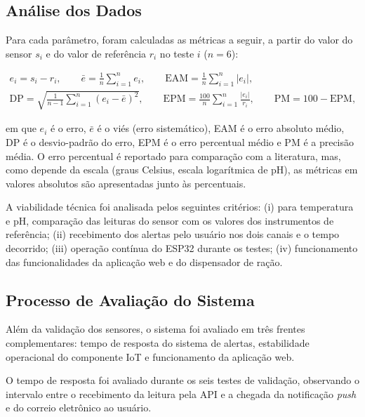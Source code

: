 \documentclass[11pt,a4paper]{article}
\begin{document}
\subsection{Análise dos Dados}

Para cada parâmetro, foram calculadas as métricas a seguir, a partir do valor do sensor $s_i$ e do valor de referência $r_i$ no teste $i$ ($n = 6$):

\begin{equation}
\begin{array}{c}
\displaystyle
e_i = s_i - r_i, \qquad
\bar{e} = \frac{1}{n}\sum_{i=1}^{n} e_i, \qquad
\mathrm{EAM} = \frac{1}{n}\sum_{i=1}^{n} |e_i|, \\[4mm]
\displaystyle
\mathrm{DP} = \sqrt{\frac{1}{n-1}\sum_{i=1}^{n}\left(e_i-\bar{e}\right)^2}, \qquad
\mathrm{EPM} = \frac{100}{n}\sum_{i=1}^{n} \frac{|e_i|}{r_i}, \qquad
\mathrm{PM} = 100 - \mathrm{EPM},
\end{array}
\end{equation}

\noindent em que $e_i$ é o erro, $\bar{e}$ é o viés (erro sistemático), EAM é o erro absoluto médio, DP é o desvio-padrão do erro, EPM é o erro percentual médio e PM é a precisão média. O erro percentual é reportado para comparação com a literatura, mas, como depende da escala (graus Celsius, escala logarítmica de pH), as métricas em valores absolutos são apresentadas junto às percentuais.
 
A viabilidade técnica foi analisada pelos seguintes critérios: (i) para temperatura e pH, comparação das leituras do sensor com os valores dos instrumentos de referência; (ii) recebimento dos alertas pelo usuário nos dois canais e o tempo decorrido; (iii) operação contínua do ESP32 durante os testes; (iv) funcionamento das funcionalidades da aplicação web e do dispensador de ração.
 
\subsection{Processo de Avaliação do Sistema}
Além da validação dos sensores, o sistema foi avaliado em três frentes complementares: tempo de resposta do sistema de alertas, estabilidade operacional do componente IoT e funcionamento da aplicação web.
 
O tempo de resposta foi avaliado durante os seis testes de validação, observando o intervalo entre o recebimento da leitura pela API e a chegada da notificação \textit{push} e do correio eletrônico ao usuário.
 
\end{document}
